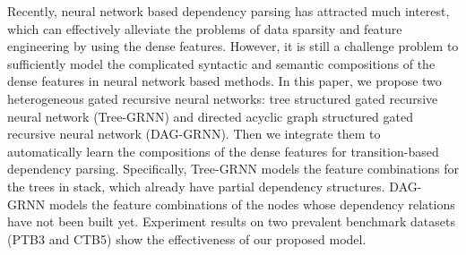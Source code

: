 Recently, neural network based dependency parsing has attracted much interest, which can effectively alleviate the problems of data sparsity and feature engineering by using the dense features. However, it is still a challenge problem to sufficiently model the complicated syntactic and semantic compositions of the dense features in neural network based methods. In this paper, we propose two heterogeneous gated recursive neural networks: tree structured gated recursive neural network (Tree-GRNN) and directed acyclic graph structured gated recursive neural network (DAG-GRNN). Then we integrate them to automatically learn the compositions of the dense features for transition-based dependency parsing. Specifically, Tree-GRNN models the feature combinations for the trees in stack, which already have partial dependency structures. DAG-GRNN models the feature combinations of the nodes whose dependency relations have not been built yet. Experiment results on two prevalent benchmark datasets (PTB3 and CTB5) show the effectiveness of our proposed model.
